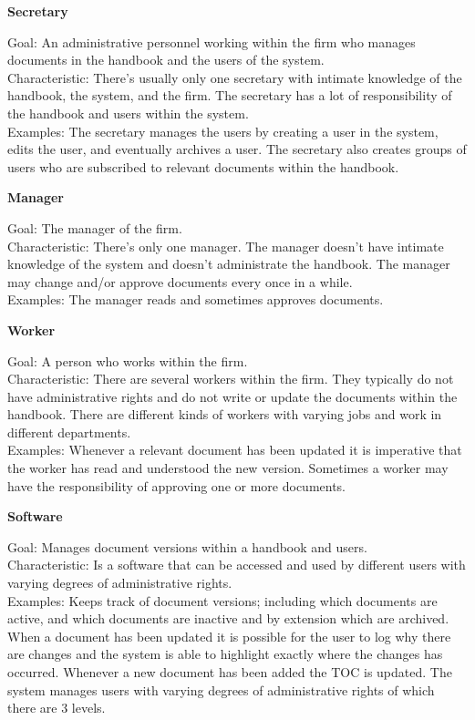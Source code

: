 \textbf{Secretary}

Goal: An administrative personnel working within the firm who manages documents in the handbook and the users of the system.
\\
Characteristic: There’s usually only one secretary with intimate knowledge of the handbook, the system, and the firm. The secretary has a lot of responsibility of the handbook and users within the system.
\\
Examples: The secretary manages the users by creating a user in the system, edits the user, and eventually archives a user.
The secretary also creates groups of users who are subscribed to relevant documents within the handbook.

\textbf{Manager}

Goal: The manager of the firm.
\\
Characteristic: There’s only one manager. The manager doesn’t have intimate knowledge of the system and doesn’t administrate the handbook.
The manager may change and/or approve documents every once in a while.
\\
Examples: The manager reads and sometimes approves documents.

\textbf{Worker}

Goal: A person who works within the firm.
\\
Characteristic: There are several workers within the firm. They typically do not have administrative rights and do not write or update the documents within the handbook. There are different kinds of workers with varying jobs and work in different departments.
\\
Examples: Whenever a relevant document has been updated it is imperative that the worker has read and understood the new version.
Sometimes a worker may have the responsibility of approving one or more documents.

\textbf{Software}

Goal:
Manages document versions within a handbook and users.
\\
Characteristic: 
Is a software that can be accessed and used by different users with varying degrees of administrative rights.
\\
Examples: 
Keeps track of document versions; including which documents are active, and which documents are inactive and by extension which are archived. 
When a document has been updated it is possible for the user to log why there are changes and the system is able to highlight exactly where the changes has occurred.
Whenever a new document has been added the TOC is updated.
The system manages users with varying degrees of administrative rights of which there are 3 levels.


